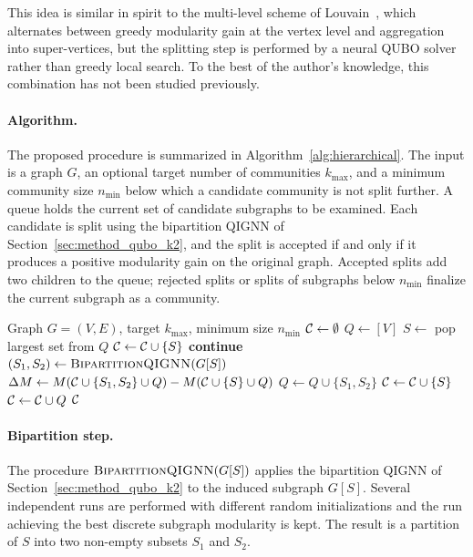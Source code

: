 This idea is similar in spirit to the multi-level scheme of
Louvain~\cite{blondel2008louvain}, which alternates between
greedy modularity gain at the vertex level and aggregation into
super-vertices, but the splitting step is performed by a neural
QUBO solver rather than greedy local search. To the best of the
author's knowledge, this combination has not been studied
previously.

\paragraph{Algorithm.}
The proposed procedure is summarized in
Algorithm~\ref{alg:hierarchical}. The input is a graph $G$, an
optional target number of communities $k_{\max}$, and a minimum
community size $n_{\min}$ below which a candidate community is
not split further. A queue holds the current set of candidate
subgraphs to be examined. Each candidate is split using the
bipartition QIGNN of Section~\ref{sec:method_qubo_k2}, and the
split is accepted if and only if it produces a positive modularity
gain on the original graph. Accepted splits add two children to
the queue; rejected splits or splits of subgraphs below $n_{\min}$
finalize the current subgraph as a community.

\begin{algorithm}[H]
\caption{Hierarchical QIGNN}
\label{alg:hierarchical}
\begin{algorithmic}[1]
\Require Graph $G = (V, E)$, target $k_{\max}$, minimum size $n_{\min}$
\State $\mathcal{C} \gets \emptyset$ 
\State $Q \gets [V]$ 
    \State $S \gets$ pop largest set from $Q$
        \State $\mathcal{C} \gets \mathcal{C} \cup \{S\}$
        \State \textbf{continue}
    \EndIf
    \State $(S_1, S_2) \gets \textsc{BipartitionQIGNN}(G[S])$
    \State $\Delta M \gets M(\mathcal{C} \cup \{S_1, S_2\} \cup Q) - M(\mathcal{C} \cup \{S\} \cup Q)$
        \State $Q \gets Q \cup \{S_1, S_2\}$
    \Else
        \State $\mathcal{C} \gets \mathcal{C} \cup \{S\}$
    \EndIf
\EndWhile
\State $\mathcal{C} \gets \mathcal{C} \cup Q$
\State \Return $\mathcal{C}$
\end{algorithmic}
\end{algorithm}

\paragraph{Bipartition step.}
The procedure $\textsc{BipartitionQIGNN}(G[S])$ applies the
bipartition QIGNN of Section~\ref{sec:method_qubo_k2} to the
induced subgraph $G[S]$. Several independent runs are performed
with different random initializations and the run achieving the
best discrete subgraph modularity is kept. The result is a
partition of $S$ into two non-empty subsets $S_1$ and $S_2$.

